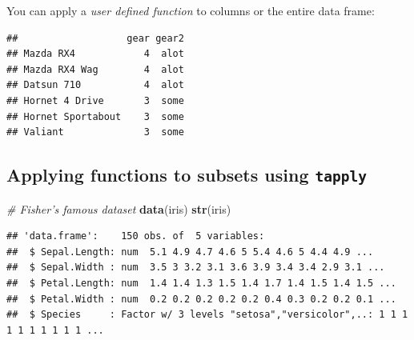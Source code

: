 \documentclass[]{book}
\makeatletter
\newenvironment{Shaded}{\begin{snugshade}}{\end{snugshade}}
\newcommand{\KeywordTok}[1]{\textcolor[rgb]{0.13,0.29,0.53}{\textbf{#1}}}
\newcommand{\DecValTok}[1]{\textcolor[rgb]{0.00,0.00,0.81}{#1}}
\newcommand{\StringTok}[1]{\textcolor[rgb]{0.31,0.60,0.02}{#1}}
\newcommand{\CommentTok}[1]{\textcolor[rgb]{0.56,0.35,0.01}{\textit{#1}}}
\newcommand{\ControlFlowTok}[1]{\textcolor[rgb]{0.13,0.29,0.53}{\textbf{#1}}}
\newcommand{\OperatorTok}[1]{\textcolor[rgb]{0.81,0.36,0.00}{\textbf{#1}}}
\newcommand{\NormalTok}[1]{#1}
\newenvironment{kframe}{%
\medskip{}
\setlength{\fboxsep}{.8em}
 \def\at@end@of@kframe{}%
 \ifinner\ifhmode%
  \def\at@end@of@kframe{\end{minipage}}%
  \begin{minipage}{\columnwidth}%
 \fi\fi%
 \def\FrameCommand##1{\hskip\@totalleftmargin \hskip-\fboxsep
 \colorbox{shadecolor}{##1}\hskip-\fboxsep
     \hskip-\linewidth \hskip-\@totalleftmargin \hskip\columnwidth}%
 \MakeFramed {\advance\hsize-\width
   \@totalleftmargin\z@ \linewidth\hsize
   \@setminipage}}%
 {\par\unskip\endMakeFramed%
 \at@end@of@kframe}
\renewenvironment{Shaded}{\begin{kframe}}{\end{kframe}}
\theoremstyle{definition}
\theoremstyle{definition}
\theoremstyle{definition}
\theoremstyle{remark}
\makeatother
\begin{document}
You can apply a \emph{user defined function} to columns or the entire
data frame:

\begin{Shaded}
\end{Shaded}

\begin{verbatim}
##                   gear gear2
## Mazda RX4            4  alot
## Mazda RX4 Wag        4  alot
## Datsun 710           4  alot
## Hornet 4 Drive       3  some
## Hornet Sportabout    3  some
## Valiant              3  some
\end{verbatim}

\subsection{\texorpdfstring{Applying functions to subsets using
\texttt{tapply}}{Applying functions to subsets using tapply}}\label{applying-functions-to-subsets-using-tapply}

\begin{Shaded}
\begin{Highlighting}[]
\CommentTok{# Fisher's famous dataset}
\KeywordTok{data}\NormalTok{(iris)}
\KeywordTok{str}\NormalTok{(iris)}
\end{Highlighting}
\end{Shaded}

\begin{verbatim}
## 'data.frame':    150 obs. of  5 variables:
##  $ Sepal.Length: num  5.1 4.9 4.7 4.6 5 5.4 4.6 5 4.4 4.9 ...
##  $ Sepal.Width : num  3.5 3 3.2 3.1 3.6 3.9 3.4 3.4 2.9 3.1 ...
##  $ Petal.Length: num  1.4 1.4 1.3 1.5 1.4 1.7 1.4 1.5 1.4 1.5 ...
##  $ Petal.Width : num  0.2 0.2 0.2 0.2 0.2 0.4 0.3 0.2 0.2 0.1 ...
##  $ Species     : Factor w/ 3 levels "setosa","versicolor",..: 1 1 1 1 1 1 1 1 1 1 ...
\end{verbatim}
\end{document}
